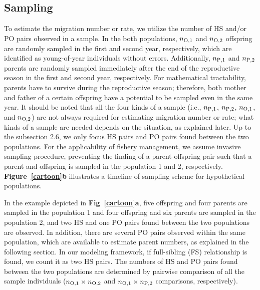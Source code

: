 \documentclass[12pt, English]{article}
\begin{document}
\begin{spacing}{1.9}
\begin{center}
\end{center}

\subsection{Sampling}

To estimate the migration number or rate, we utilize the number of HS and/or PO pairs observed in a sample. In the both populations, $n_{\rm O, 1}$ and $n_{\rm O, 2}$ offspring are randomly sampled in the first and second year, respectively, which are identified as young-of-year individuals without errors. Additionally, $n_{\rm P, 1}$ and $n_{\rm P, 2}$ parents are randomly sampled immediately after the end of the reproductive season in the first and second year, respectively. For mathematical tractability, parents have to survive during the reproductive season; therefore, both mother and father of a certain offspring have a potential to be sampled even in the same year. It should be noted that all the four kinds of a sample (i.e., $n_{\rm P, 1}$, $n_{\rm P, 2}$, $n_{\rm O, 1}$, and $n_{\rm O, 2}$) are not always required for estimating migration number or rate; what kinds of a sample are needed depends on the situation, as explained later. Up to the subsection 2.6, we only focus HS pairs and PO pairs found between the two populations. For the applicability of fishery management, we assume invasive sampling procedure, preventing the finding of a parent-offspring pair such that a parent and offspring is sampled in the population 1 and 2, respectively. {\bf Figure~\ref{cartoon}b} illustrates a timeline of sampling scheme for hypothetical populations. 

In the example depicted in {\bf Fig~\ref{cartoon}a}, five offspring and four parents are sampled in the population 1 and four offspring and six parents are sampled in the population 2, and two HS and one PO pairs found between the two populations are observed. In addition, there are several PO pairs observed within the same population, which are available to estimate parent numbers, as explained in the following section. In our modeling framework, if full-sibling (FS) relationship is found, we count it as two HS pairs. The numbers of HS and PO pairs found between the two populations are determined by pairwise comparison of all the sample individuals ($n_{\rm O,1}\times n_{\rm O,2}$ and $n_{\rm O,1}\times n_{\rm P,2}$ comparisons, respectively). 


\end{spacing}
\end{document}
